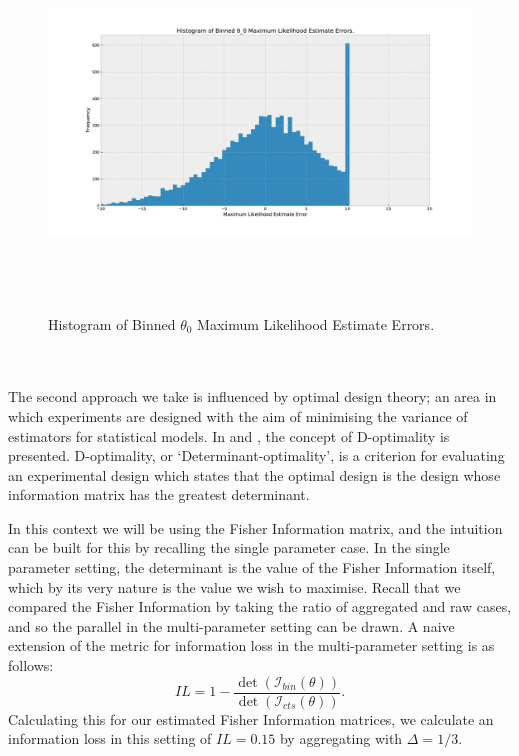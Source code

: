 \documentclass[11pt,a4,twosided,singlespacing,titlepagenumber=on,numbers=endperiod]{scrreprt}
\numberwithin{equation}{chapter} %
\theoremstyle{remark}
\begin{document}
\begin{figure}[!h]
	\includegraphics[height=10cm, width=16cm]{mle_error.pdf}
	\centering
	\caption{Histogram of Binned $\theta_0$ Maximum Likelihood Estimate Errors.}
	\label{fig:nhpp_mle_error}
\end{figure}
\\\\
The second approach we take is influenced by optimal design theory; an area in which experiments are designed with the aim of minimising the variance of estimators for statistical models. In \cite{optimum_design} and \cite{factorial_design}, the concept of D-optimality is presented. D-optimality, or `Determinant-optimality', is a criterion for evaluating an experimental design which states that the optimal design is the design whose information matrix has the greatest determinant.

In this context we will be using the Fisher Information matrix, and the intuition can be built for this by recalling the single parameter case. In the single parameter setting, the determinant is the value of the Fisher Information itself, which by its very nature is the value we wish to maximise. Recall that we compared the Fisher Information by taking the ratio of aggregated and raw cases, and so the parallel in the multi-parameter setting can be drawn. A naive extension of the metric for information loss in the multi-parameter setting is as follows:
\begin{equation}\label{eq:multi_info_loss}
	IL = 1 - \frac{\det \left( \mathcal{I}_{bin}(\theta) \right)}{\det \left( \mathcal{I}_{cts}(\theta) \right)}.
\end{equation}
Calculating this for our estimated Fisher Information matrices, we calculate an information loss in this setting of $IL=0.15$ by aggregating with $\Delta = 1/3$.
\end{document}
